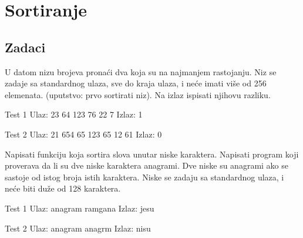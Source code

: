 \chapter{Sortiranje}

\section{Zadaci}

\begin{Exercise}[label=501]
  U datom nizu brojeva pronaći dva koja su na najmanjem
  rastojanju. Niz se zadaje sa standardnog ulaza, sve do kraja ulaza,
  i neće imati više od 256 elemenata. (uputstvo: prvo sortirati
  niz). Na izlaz ispisati njihovu razliku.
  
\begin{miditest}
\begin{test}{Test 1}
Ulaz:   23 64 123 76 22 7
Izlaz:  1
\end{test}
\end{miditest}

\begin{miditest}
\begin{test}{Test 2}
Ulaz:   21 654 65 123 65 12 61
Izlaz:  0
\end{test}
\end{miditest}
  
\end{Exercise}

\begin{Answer}[ref=501]
\end{Answer}
\begin{Exercise}[label=502]
  Napisati funkciju koja sortira slova unutar niske
  karaktera. Napisati program koji proverava da li su dve niske
  karaktera anagrami. Dve niske su anagrami ako se sastoje od istog
  broja istih karaktera. Niske se zadaju sa standardnog ulaza, i neće
  biti duže od 128 karaktera.
  
\begin{miditest}
\begin{test}{Test 1}
Ulaz:   anagram ramgana
Izlaz:  jesu
\end{test}
\end{miditest}
\begin{miditest}
\begin{test}{Test 2}
Ulaz:   anagram anagrm
Izlaz:  nisu
\end{test}
\end{miditest}
  
\end{Exercise}

